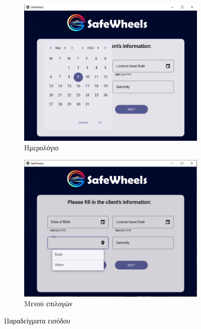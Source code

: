 \documentclass{llncs}
\begin{document}
\begin{figure}
    \centering
    \begin{subfigure}{0.45\linewidth}
        \includegraphics[width=\linewidth]{images/driver_datepicker.png}
        \caption{Ημερολόγιο}
        \label{fig:date}
    \end{subfigure}
    \begin{subfigure}{0.45\linewidth}
        \includegraphics[width=\linewidth]{images/driver_area.png}
        \caption{Μενού επιλογών}
        \label{fig:area}
    \end{subfigure}
    \caption{Παραδείγματα εισόδου}
    \label{fig:driver_examples}
\end{figure}
\end{document}
